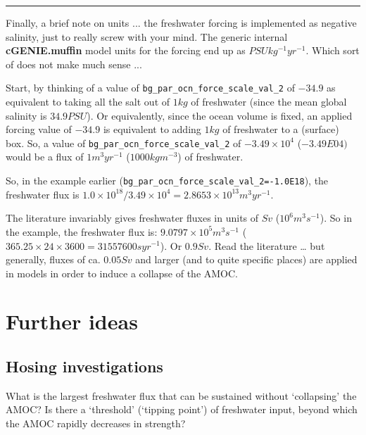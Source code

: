 \documentclass[11pt,fleqn]{book} %
\begin{document}
\hfill \break
\noindent\rule{4cm}{0.1mm}
\hfill \break

\noindent Finally, a brief note on units ... the freshwater forcing is implemented as negative salinity, just to really screw with your mind. The generic internal \textbf{cGENIE.muffin} model units for the forcing end up as \(PSU kg^{-1} yr^{-1}\). Which sort of does not make much sense ...

Start, by thinking of a value of \texttt{bg\_par\_ocn\_force\_scale\_val\_2} of \(-34.9\) as equivalent to taking all the salt out of \(1 kg\) of freshwater (since the mean global salinity is \(34.9 PSU\)). Or equivalently, since the ocean volume is fixed, an applied forcing value of \(-34.9\) is equivalent to adding \(1 kg\) of freshwater to a (surface) box. So, a value of \texttt{bg\_par\_ocn\_force\_scale\_val\_2} of \(-3.49\times10^{4}\) (\(-3.49E04)\) would be a flux of \(1 m^{3} yr^{-1}\) (\(1000 kg m^{-3}\)) of freshwater.

So, in the example earlier (\texttt{bg\_par\_ocn\_force\_scale\_val\_2=-1.0E18}), the freshwater flux is \(1.0\times10^{18}/3.49\times10^{4} = 2.8653\times10^{13} m^{3} yr^{-1}\).

The literature invariably gives freshwater fluxes in units of \(Sv\) (\(10^{6} m^{3} s^{-1}\)). So in the example, the freshwater flux is: \(9.0797\times10^{5} m^{3} s^{-1}\) (\(365.25\times24\times3600 = 31557600 s yr^{-1}\)). Or \(0.9 Sv\). Read the literature … but generally, fluxes of ca. \(0.05 Sv\) and larger (and to quite specific places) are applied in models in order to induce a collapse of the AMOC.


\newpage


\section{Further ideas}


\subsection{Hosing investigations}

What is the largest freshwater flux that can be sustained without ‘collapsing’ the AMOC? Is there a ‘threshold’ (‘tipping point’) of freshwater input, beyond which the AMOC rapidly decreases in strength?
\end{document}
